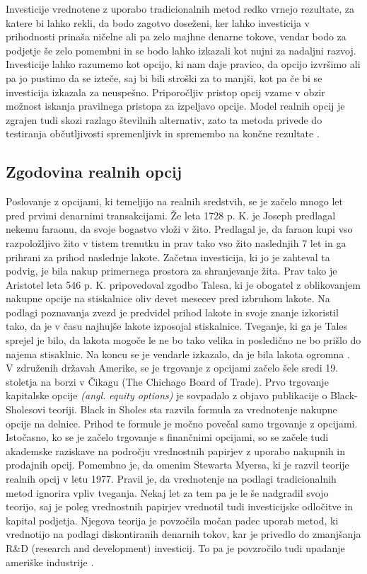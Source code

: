 \documentclass[12pt, a4paper]{amsart}
\theoremstyle{definition} %
\theoremstyle{plain} %
\begin{document}
Investicije vrednotene z uporabo tradicionalnih metod redko vrnejo rezultate, za katere bi lahko rekli, da bodo zagotvo doseženi, ker lahko investicija v prihodnosti prinaša ničelne ali pa zelo majhne denarne tokove, vendar bodo za podjetje še zelo pomembni in se bodo lahko izkazali kot nujni za nadaljni razvoj. Investicije lahko razumemo kot opcijo, ki nam daje pravico, da opcijo izvršimo ali pa jo pustimo da se izteče, saj bi bili stroški za to manjši, kot pa če bi se investicija izkazala za neuspešno. Priporočljiv pristop opcij vzame v obzir možnost iskanja pravilnega pristopa za izpeljavo opcije. Model realnih opcij je zgrajen tudi skozi razlago številnih alternativ, zato ta metoda privede do testiranja občutljivosti spremenljivk in spremembo na končne rezultate \cite[str. 93, 94]{Mun}. \\

\subsection{Zgodovina realnih opcij}
Poslovanje z opcijami, ki temeljijo na realnih sredstvih, se je začelo mnogo let pred prvimi denarnimi transakcijami. Že leta 1728 p. K. je Joseph predlagal nekemu faraonu, da svoje bogastvo vloži v žito. Predlagal je, da faraon kupi vso razpoložljivo žito v tistem trenutku in prav tako vso žito naslednjih 7 let in ga prihrani za prihod naslednje lakote. Začetna investicija, ki jo je zahteval ta podvig, je bila nakup primernega prostora za shranjevanje žita. Prav tako je Aristotel leta 546 p. K. pripovedoval zgodbo Talesa, ki je obogatel z oblikovanjem nakupne opcije na stiskalnice oliv devet mesecev pred izbruhom lakote. Na podlagi poznavanja zvezd je predvidel prihod lakote in svoje znanje izkoristil tako, da je v času najhujše lakote izposojal stiskalnice. Tveganje, ki ga je Tales sprejel je bilo, da lakota mogoče le ne bo tako velika in posledično ne bo prišlo do najema stisaklnic. Na koncu se je vendarle izkazalo, da je bila lakota ogromna \cite[str. 13]{Brach}. \\

V združenih državah Amerike, se je trgovanje z opcijami začelo šele sredi 19. stoletja na borzi v Čikagu (The Chichago Board of Trade). Prvo trgovanje kapitalske opcije \textit{(angl. equity options)} je sovpadalo z objavo publikacije o Black-Sholesovi teoriji. Black in Sholes sta razvila formula za vrednotenje nakupne opcije na delnice. Prihod te formule je močno povečal samo trgovanje z opcijami. Istočasno, ko se je začelo trgovanje s finančnimi opcijami, so se začele tudi akademske raziskave na področju vrednostnih papirjev z uporabo nakupnih in prodajnih opcij. Pomembno je, da omenim Stewarta Myersa, ki je razvil teorije realnih opcij v letu 1977. Pravil je, da vrednotenje na podlagi tradicionalnih metod ignorira vpliv tveganja. Nekaj let za tem pa je le še nadgradil svojo teorijo, saj je poleg vrednostnih papirjev vrednotil tudi investicijske odločitve in kapital podjetja. Njegova teorija je povzočila močan padec uporab metod, ki vrednotijo na podlagi diskontiranih denarnih tokov, kar je privedlo do zmanjšanja R\&D (research and development) investicij. To pa je povzročilo tudi upadanje ameriške industrije \cite[str. 14, 15]{Brach}.  \\
\end{document}
